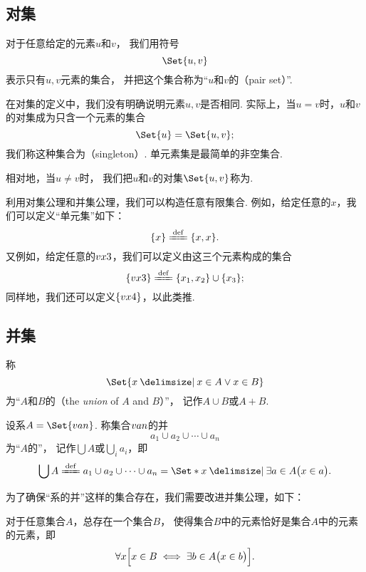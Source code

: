 \subsection{对集}
\begin{definition}
对于任意给定的元素\(u\)和\(v\)，
我们用符号\[
	\Set{ u, v }
\]表示只有\(u,v\)元素的集合，
并把这个集合称为“\(u\)和\(v\)的（pair set）”.
\end{definition}
在对集的定义中，我们没有明确说明元素\(u,v\)是否相同.
实际上，当\(u=v\)时，\(u\)和\(v\)的对集成为只含一个元素的集合\[
	\Set{ u } = \Set{ u, v };
\]
我们称这种集合为（singleton）.
单元素集是最简单的非空集合.

相对地，当\(u \neq v\)时，
我们把\(u\)和\(v\)的对集\(\Set{u,v}\)称为.

利用对集公理和并集公理，我们可以构造任意有限集合.
例如，给定任意的\(x\)，我们可以定义“单元集”如下：\[
\{x\} \defeq \{x, x\}.
\]
又例如，给定任意的\(v{x}{3}\)，我们可以定义由这三个元素构成的集合
\[
	\{\v{x}{3}\} \defeq \{x_1,x_2\}\cup\{x_3\};
\]
同样地，我们还可以定义\(\{v{x}{4}\}\)，以此类推.


\subsection{并集}
\begin{definition}
称\[
	\Set{ x \given x \in A \lor x \in B }
\]为“\(A\)和\(B\)的（the \emph{union} of \(A\) and \(B\)）”，
记作\(A \cup B\)或\(A+B\).
\end{definition}


\begin{definition}
设系\(A = \Set{\v{a}{n}}\).
称集合\(v{a}{n}\)的并\[
	a_1 \cup a_2 \cup \dotsb \cup a_n
\]为“\(A\)的”，
记作\(\bigcup A\)或\(\bigcup\limits_i a_i\)，即\[
	\bigcup A
	\defeq
	a_1 \cup a_2 \cup \dotsb \cup a_n
	= \Set*{ x \given \exists a \in A \bigl( x \in a \bigr) }.
\]
\end{definition}


为了确保“系的并”这样的集合存在，我们需要改进并集公理，如下：
\begin{axiom}[并集公理II]
对于任意集合\(A\)，总存在一个集合\(B\)，
使得集合\(B\)中的元素恰好是集合\(A\)中的元素的元素，即\[
	\forall x \Bigl[
		x \in B
		\iff
		\exists b \in A \bigl( x \in b \bigr)
	\Bigr].
\]
\end{axiom}

